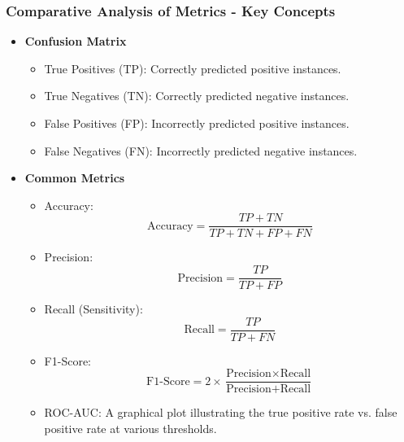 \documentclass[aspectratio=169]{beamer}
\begin{document}
\begin{frame}[fragile]
    \frametitle{Comparative Analysis of Metrics - Key Concepts}
    \begin{itemize}
        \item \textbf{Confusion Matrix}
        \begin{itemize}
            \item True Positives (TP): Correctly predicted positive instances.
            \item True Negatives (TN): Correctly predicted negative instances.
            \item False Positives (FP): Incorrectly predicted positive instances.
            \item False Negatives (FN): Incorrectly predicted negative instances.
        \end{itemize}
        
        \item \textbf{Common Metrics}
        \begin{itemize}
            \item Accuracy:
            \begin{equation}
            \text{Accuracy} = \frac{TP + TN}{TP + TN + FP + FN}
            \end{equation}
            
            \item Precision:
            \begin{equation}
            \text{Precision} = \frac{TP}{TP + FP}
            \end{equation}

            \item Recall (Sensitivity):
            \begin{equation}
            \text{Recall} = \frac{TP}{TP + FN}
            \end{equation}

            \item F1-Score:
            \begin{equation}
            \text{F1-Score} = 2 \times \frac{\text{Precision} \times \text{Recall}}{\text{Precision} + \text{Recall}}
            \end{equation}

            \item ROC-AUC: A graphical plot illustrating the true positive rate vs. false positive rate at various thresholds.
        \end{itemize}
    \end{itemize}
\end{frame}
\end{document}
